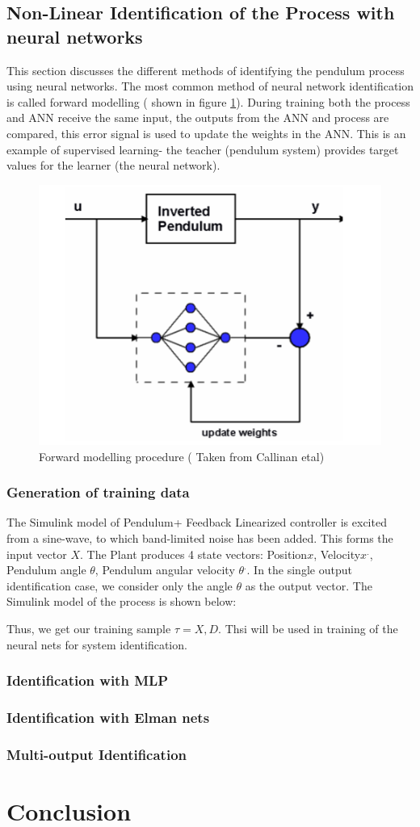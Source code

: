 \documentclass[12pt, onecolumn]{extarticle}
\begin{document}
\subsection{Non-Linear Identification of the Process with neural networks} This section discusses the different methods of identifying the pendulum process using neural
networks. The most common method of neural network identification is called forward
modelling ( shown in figure \ref{fig:forward_modelling}). During training both the process and ANN receive the same input,
the outputs from the ANN and process are compared, this error signal is used to update the
weights in the ANN. This is an example of supervised learning- the teacher (pendulum
system) provides target values for the learner (the neural network). 
\begin{figure}[h!]
\centering
\includegraphics[width=0.7\linewidth]{forward_modelling}
\caption{Forward modelling procedure ( Taken from Callinan etal)}
\label{fig:forward_modelling}
\end{figure}

\subsubsection{Generation of training data} The Simulink model of Pendulum+ Feedback Linearized controller is excited from a sine-wave, to which band-limited noise has been added. This forms the input vector $ X $. The Plant produces 4 state vectors: Position$ x $, Velocity$ x^{.} $, Pendulum angle $ \theta $, Pendulum angular velocity $ \theta^{.} $. In the single output identification case, we consider only the angle $ \theta $ as the output vector. The Simulink model of the process is shown below:

Thus, we get our training sample $ \tau = {X, D} $. Thsi will be used in training of the neural nets for system identification.

\subsubsection{Identification with MLP} 
\subsubsection{Identification with Elman nets}
\subsubsection{Multi-output Identification}
\section{Conclusion}
	
\end{document}
